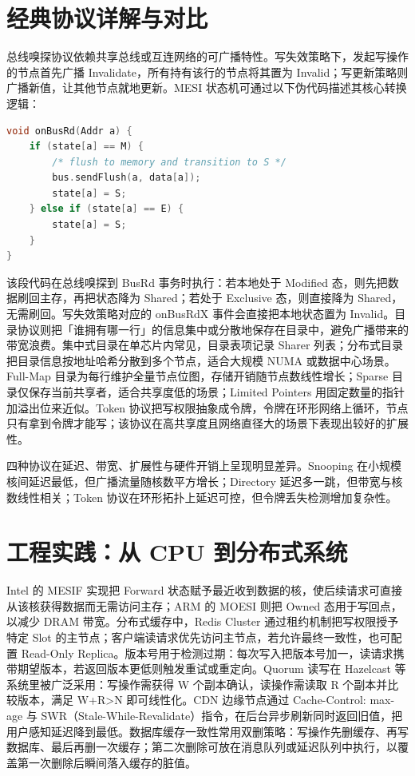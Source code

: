 \chapter{经典协议详解与对比}
总线嗅探协议依赖共享总线或互连网络的可广播特性。写失效策略下，发起写操作的节点首先广播 Invalidate，所有持有该行的节点将其置为 Invalid；写更新策略则广播新值，让其他节点就地更新。MESI 状态机可通过以下伪代码描述其核心转换逻辑：\par
\begin{lstlisting}[language=c]
void onBusRd(Addr a) {
    if (state[a] == M) {
        /* flush to memory and transition to S */
        bus.sendFlush(a, data[a]);
        state[a] = S;
    } else if (state[a] == E) {
        state[a] = S;
    }
}
\end{lstlisting}
该段代码在总线嗅探到 BusRd 事务时执行：若本地处于 Modified 态，则先把数据刷回主存，再把状态降为 Shared；若处于 Exclusive 态，则直接降为 Shared，无需刷回。写失效策略对应的 onBusRdX 事件会直接把本地状态置为 Invalid。目录协议则把「谁拥有哪一行」的信息集中或分散地保存在目录中，避免广播带来的带宽浪费。集中式目录在单芯片内常见，目录表项记录 Sharer 列表；分布式目录把目录信息按地址哈希分散到多个节点，适合大规模 NUMA 或数据中心场景。Full-Map 目录为每行维护全量节点位图，存储开销随节点数线性增长；Sparse 目录仅保存当前共享者，适合共享度低的场景；Limited Pointers 用固定数量的指针加溢出位来近似。Token 协议把写权限抽象成令牌，令牌在环形网络上循环，节点只有拿到令牌才能写；该协议在高共享度且网络直径大的场景下表现出较好的扩展性。\par
四种协议在延迟、带宽、扩展性与硬件开销上呈现明显差异。Snooping 在小规模核间延迟最低，但广播流量随核数平方增长；Directory 延迟多一跳，但带宽与核数线性相关；Token 协议在环形拓扑上延迟可控，但令牌丢失检测增加复杂性。\par
\chapter{工程实践：从 CPU 到分布式系统}
Intel 的 MESIF 实现把 Forward 状态赋予最近收到数据的核，使后续请求可直接从该核获得数据而无需访问主存；ARM 的 MOESI 则把 Owned 态用于写回点，以减少 DRAM 带宽。分布式缓存中，Redis Cluster 通过租约机制把写权限授予特定 Slot 的主节点；客户端读请求优先访问主节点，若允许最终一致性，也可配置 Read-Only Replica。版本号用于检测过期：每次写入把版本号加一，读请求携带期望版本，若返回版本更低则触发重试或重定向。Quorum 读写在 Hazelcast 等系统里被广泛采用：写操作需获得 W 个副本确认，读操作需读取 R 个副本并比较版本，满足 W+R>N 即可线性化。CDN 边缘节点通过 Cache-Control: max-age 与 SWR（Stale-While-Revalidate）指令，在后台异步刷新同时返回旧值，把用户感知延迟降到最低。数据库缓存一致性常用双删策略：写操作先删缓存、再写数据库、最后再删一次缓存；第二次删除可放在消息队列或延迟队列中执行，以覆盖第一次删除后瞬间落入缓存的脏值。\par
